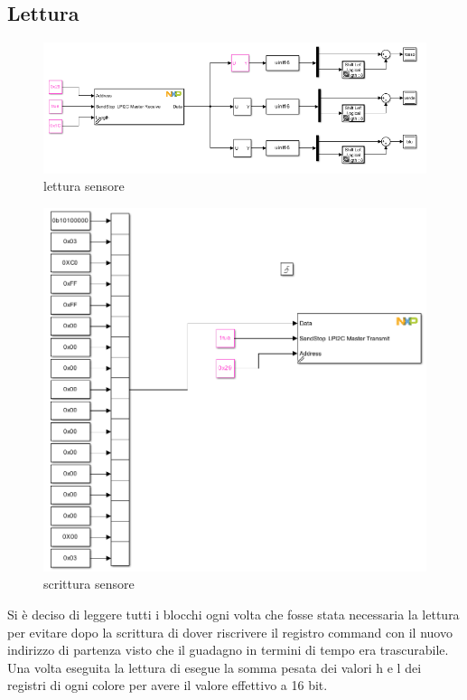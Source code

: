 \documentclass[a4paper,12pt]{report}
\begin{document}
\subsection{Lettura}
\begin{figure}[h] 
    \centering
    \includegraphics[width=0.76\linewidth]{images/Immagini sensore/lettura sensore.png}
    \caption{lettura sensore}
    \end{figure}
\begin{figure}[h]
    \centering
    \includegraphics[width=0.6\linewidth]{images/Immagini sensore/scrittura sensore.png}
    \caption{scrittura sensore}
    \end{figure}
Si è deciso di leggere tutti i blocchi ogni volta che fosse stata necessaria la lettura per evitare dopo la scrittura di dover riscrivere il registro command con il nuovo indirizzo di partenza visto che il guadagno in termini di tempo era trascurabile. Una volta eseguita la lettura di esegue la somma pesata dei valori h e l dei registri di ogni colore per avere il valore effettivo a 16 bit.
\end{document}
